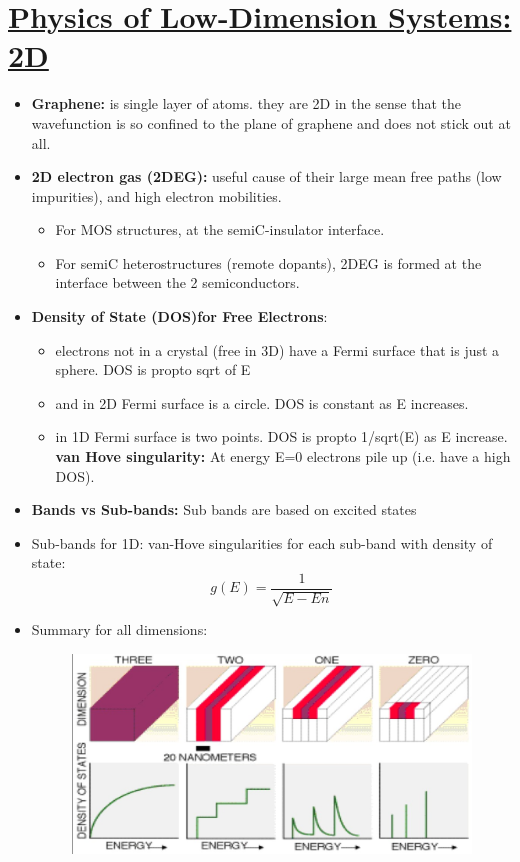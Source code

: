 \setcounter{section}{20}

\section[Physics of Low-Dimension Systems: 2D]{\hyperlink{toc}{Physics of Low-Dimension Systems: 2D}}

\begin{itemize}
    \item \textbf{Graphene:} is single layer of atoms. they are 2D in the sense that the wavefunction is so confined to the plane of graphene and does not stick out at all.
    \item \textbf{2D electron gas (2DEG):} useful cause of their large mean free paths (low impurities), and high electron mobilities. 
    \begin{itemize}
        \item For MOS structures, at the semiC-insulator interface.
        \item For semiC heterostructures (remote dopants), 2DEG is formed at the interface between the 2 semiconductors.
    \end{itemize}
    \item \textbf{Density of State (DOS)for Free Electrons}:
    \begin{itemize}
        \item electrons not in a crystal (free in 3D) have a Fermi surface that is just a sphere. DOS is propto sqrt of E
        \item and in 2D Fermi surface is a circle. DOS is constant as E increases.
        \item in 1D Fermi surface is two points. DOS is propto 1/sqrt(E) as E increase. \textbf{van Hove singularity:} At energy E=0 electrons pile up (i.e. have a high DOS).
    \end{itemize}
    \item \textbf{Bands vs Sub-bands:} Sub bands are based on excited states
    \item Sub-bands for 1D:
    van-Hove singularities for each sub-band with density of state:
    \begin{equation}
        {g(E) = \frac{1}{\sqrt{E-En}}}
    \end{equation}
    \item Summary for all dimensions: 
    \begin{figure}
    \centering
    \includegraphics[width=0.75\linewidth]{Images/DOS.jpg}

\end{figure}
\end{itemize}

